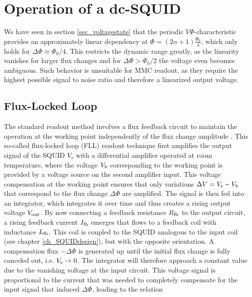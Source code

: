 \section{Operation of a dc-SQUID}\label{sec_operation}

We have seen in section \ref{sec_voltagestate} that the periodic $V\Phi$-characteristic provides an approximately linear dependency at $\Phi = (2n+1)\frac{\Phi_0}{4}$, which only holds for $\Delta\Phi\approx\Phi_0/4$. This restricts the dynamic range greatly, as the linearity vanishes for larger flux changes and for $\Delta\Phi>\Phi_0/2$ the voltage even becomes ambiguous. Such behavior is unsuitable for MMC readout, as they require the highest possible signal to noise ratio and therefore a linearized output voltage.  

\subsection{Flux-Locked Loop}\label{subsec_fll}

The standard readout method involves a flux feedback circuit to maintain the operation at the working point independently of the flux change amplitude \cite{Drung2002}. This so-called flux-locked loop (FLL) readout technique first amplifies the output signal of the SQUID $V_s$ with a differential amplifier operated at room temperature, where the voltage $V_{\rm b}$ corresponding to the working point is provided by a voltage source on the second amplifier input. This voltage compensation at the working point ensures that only variations $\Delta V = V_{\rm s}-V_{\rm b}$ that correspond to the flux change $\Delta\Phi$ are amplified. The signal is then fed into an integrator, which integrates it over time and thus creates a rising output voltage $V_{\rm out}$. By now connecting a feedback resistance $R_{\rm fb}$ to the output circuit, a rising feedback current $I_{\rm fb}$ emerges that flows to a feedback coil with inductance $L_{\rm fb}$. This coil is coupled to the SQUID analogous to the input coil (see chapter \ref{ch_SQUIDdesign}), but with the opposite orientation. A compensation flux $-\Delta\Phi$ is generated up until the initial flux change is fully canceled out, i.e. $V_{\rm s}\to 0$. The integrator will therefore approach a constant value due to the vanishing voltage at the input circuit. This voltage signal is proportional to the current that was needed to completely compensate for the input signal that induced $\Delta\Phi$, leading to the relation 


